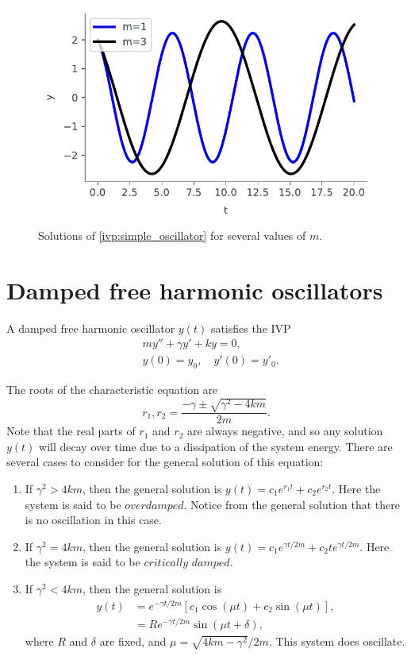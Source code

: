 \begin{figure}[H]
\centering
\includegraphics[width=\textwidth]{figures/simple_oscillator.pdf}
\caption{Solutions of \eqref{ivp:simple_oscillator} for several values of $m$.}
\label{ivp:simple_oscillator_figure}
\end{figure}


\section*{Damped free harmonic oscillators} 
A damped free harmonic oscillator $y(t)$ satisfies the IVP
\begin{align*}
	&{}my'' + \gamma y' + ky = 0 ,\\
	&{}y(0) = y_0,\quad
	y'(0) = y'_0.
\end{align*}

The roots of the characteristic equation are \[r_1,r_2 = \frac{-\gamma \pm \sqrt{\gamma^2 -4km}}{2m} .\]
Note that the real parts of $r_1$ and $r_2$ are always negative, and so any solution $y(t)$ will decay over time due to a dissipation of the system energy. 
There are several cases to consider for the general solution of this equation:
\begin{enumerate}
\item If $\gamma^2 > 4km$, then the general solution is $y(t) = c_1 e^{r_1t} + c_2e^{r_2t}$. Here the system is said to be $\textit{overdamped}$. 
Notice from the general solution that there is no oscillation in this case.
\item If $\gamma^2 = 4km$, then the general solution is $y(t) = c_1 e^{\gamma t/2m} + c_2 te^{\gamma t/2m}$. Here the system is said to be $\textit{critically damped}$.
\item If $\gamma^2 < 4km$, then the general solution is
\begin{align*}
y(t) &= e^{-\gamma t/2m} \left[c_1\cos(\mu t) + c_2 \sin (\mu t)\right],\\
&= R e^{-\gamma t/2m}  \sin (\mu t + \delta),
\end{align*}
where $R$ and $\delta$ are fixed, and $\mu = \sqrt{4km-\gamma^2}/2m.$ This system does oscillate.
\end{enumerate}

